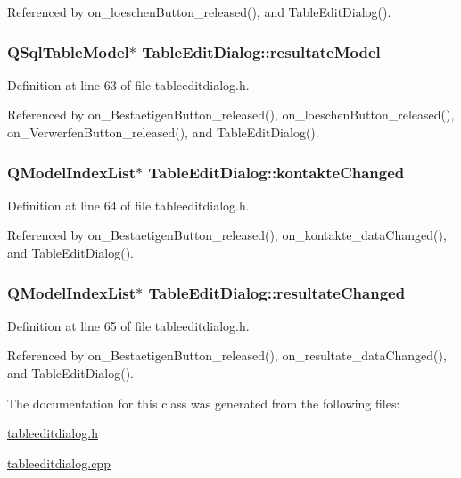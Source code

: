 Referenced by on\_\-loeschenButton\_\-released(), and TableEditDialog().\hypertarget{class_table_edit_dialog_c544c898094d550a4df24603738d576d}{
\subsubsection[resultateModel]{\setlength{\rightskip}{0pt plus 5cm}QSqlTableModel$\ast$ {\bf TableEditDialog::resultateModel}}}
\label{class_table_edit_dialog_c544c898094d550a4df24603738d576d}




Definition at line 63 of file tableeditdialog.h.

Referenced by on\_\-BestaetigenButton\_\-released(), on\_\-loeschenButton\_\-released(), on\_\-VerwerfenButton\_\-released(), and TableEditDialog().\hypertarget{class_table_edit_dialog_779a6767b90cf2a0f67d4fd3a0eef79e}{
\subsubsection[kontakteChanged]{\setlength{\rightskip}{0pt plus 5cm}QModelIndexList$\ast$ {\bf TableEditDialog::kontakteChanged}}}
\label{class_table_edit_dialog_779a6767b90cf2a0f67d4fd3a0eef79e}




Definition at line 64 of file tableeditdialog.h.

Referenced by on\_\-BestaetigenButton\_\-released(), on\_\-kontakte\_\-dataChanged(), and TableEditDialog().\hypertarget{class_table_edit_dialog_9bc0694e38258f5d52f1b2abf65f7ba3}{
\subsubsection[resultateChanged]{\setlength{\rightskip}{0pt plus 5cm}QModelIndexList$\ast$ {\bf TableEditDialog::resultateChanged}}}
\label{class_table_edit_dialog_9bc0694e38258f5d52f1b2abf65f7ba3}




Definition at line 65 of file tableeditdialog.h.

Referenced by on\_\-BestaetigenButton\_\-released(), on\_\-resultate\_\-dataChanged(), and TableEditDialog().

The documentation for this class was generated from the following files:\begin{CompactItemize}
\item 
\hyperlink{tableeditdialog_8h}{tableeditdialog.h}\item 
\hyperlink{tableeditdialog_8cpp}{tableeditdialog.cpp}\end{CompactItemize}

